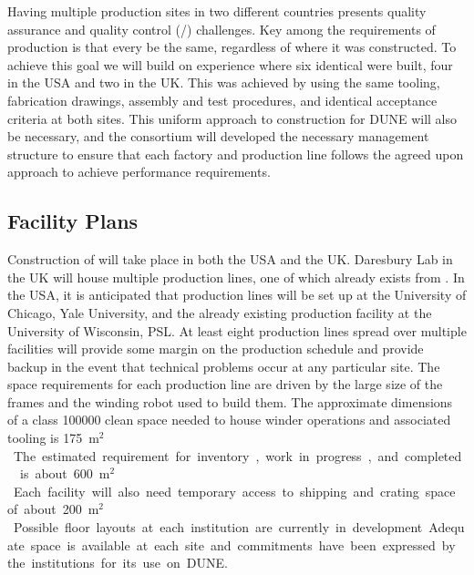 Having multiple  production sites in two different countries presents quality assurance and quality control (/) challenges. Key among the requirements of production is that every  be the same, regardless of where it was constructed. To achieve this goal we will build on  experience where six identical  were built, four in the USA and two in the UK. This was achieved by using the same tooling, fabrication drawings, assembly and test procedures, and identical acceptance criteria at both sites.  This uniform approach to construction for DUNE will also be necessary, and the  consortium will developed the necessary management structure to ensure that each factory and production line follows the agreed upon approach to achieve  performance requirements.


\subsection{Facility Plans}
\label{sec:fdsp-apa-facility}

Construction of   will take place in both the USA and the UK. Daresbury Lab in the UK will house multiple production lines, one of which already exists from . In the USA, it is anticipated that production lines will be set up at the University of Chicago, Yale University, and the already existing production facility at the University of Wisconsin, PSL. At least eight  production lines spread over multiple facilities will provide some margin on the production schedule and provide backup in the event that technical problems occur at any particular site. 
The space requirements for each production line are driven by the large size of the  frames and the winding robot used to build them. The approximate dimensions of a class \num{100000} clean space needed to house winder operations and associated tooling is \SI{175}{m$^2$}. The estimated requirement for inventory, work in progress, and completed  is about \SI{600}{m$^2$}. Each facility will also need temporary access to shipping and crating space of about \SI{200}{m$^2$}. Possible floor layouts at each institution are currently in development. Adequate space is available at each site and commitments have been expressed by the institutions for its use on DUNE. 


